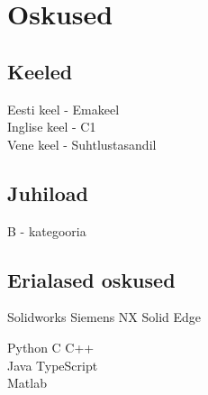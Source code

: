 \documentclass[letterpaper]{deedy-resume} %
\begin{document}
\begin{minipage}[t]{0.33\textwidth}
\sectionspace %


\section{Oskused}

\subsection{Keeled}

Eesti keel - Emakeel \\
Inglise keel - C1 \\
Vene keel - Suhtlustasandil \\

\sectionspace %


\subsection{Juhiload}

B - kategooria \\

\sectionspace %

\subsection{Erialased oskused}

\sectionspace

Solidworks \textbullet{} Siemens NX \textbullet{} Solid Edge\\

\sectionspace


\sectionspace

Python \textbullet{} C \textbullet{} C++ \\
Java \textbullet{} TypeScript \\
Matlab



\sectionspace %


\end{minipage} %
\end{document}
